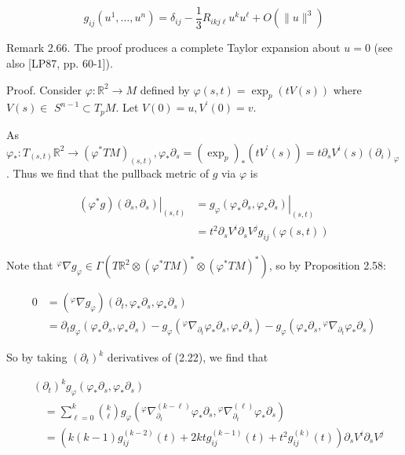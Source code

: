 \documentclass[10pt, letterpaper]{article}
\begin{document}
$$
g_{i j}\left(u^{1}, \ldots, u^{n}\right)=\delta_{i j}-\frac{1}{3} R_{i k j \ell} u^{k} u^{\ell}+O\left(\|u\|^{3}\right)
$$

Remark 2.66. The proof produces a complete Taylor expansion about $u=0$ (see also [LP87, pp. 60-1]).

Proof. Consider $\varphi: \mathbb{R}^{2} \rightarrow M$ defined by $\varphi(s, t)=\exp _{p}(t V(s))$ where $V(s) \in$ $S^{n-1} \subset T_{p} M$. Let $V(0)=u, V^{\prime}(0)=v$.

As $\varphi_{*}: T_{(s, t)} \mathbb{R}^{2} \rightarrow\left(\varphi^{*} T M\right)_{(s, t)}, \varphi_{*} \partial_{s}=\left(\exp _{p}\right)_{*}\left(t V^{\prime}(s)\right)=t \partial_{s} V^{i}(s)\left(\partial_{i}\right)_{\varphi}$. Thus we find that the pullback metric of $g$ via $\varphi$ is

$$
\begin{aligned}
\left.\left(\varphi^{*} g\right)\left(\partial_{s}, \partial_{s}\right)\right|_{(s, t)} & =\left.g_{\varphi}\left(\varphi_{*} \partial_{s}, \varphi_{*} \partial_{s}\right)\right|_{(s, t)} \\
& =t^{2} \partial_{s} V^{i} \partial_{s} V^{j} g_{i j}(\varphi(s, t))
\end{aligned}
$$

Note that ${ }^{\varphi} \nabla g_{\varphi} \in \Gamma\left(T \mathbb{R}^{2} \otimes\left(\varphi^{*} T M\right)^{*} \otimes\left(\varphi^{*} T M\right)^{*}\right)$, so by Proposition 2.58:

$$
\begin{aligned}
0 & =\left({ }^{\varphi} \nabla g_{\varphi}\right)\left(\partial_{t}, \varphi_{*} \partial_{s}, \varphi_{*} \partial_{s}\right) \\
& =\partial_{t} g_{\varphi}\left(\varphi_{*} \partial_{s}, \varphi_{*} \partial_{s}\right)-g_{\varphi}\left({ }^{\varphi} \nabla_{\partial_{t}} \varphi_{*} \partial_{s}, \varphi_{*} \partial_{s}\right)-g_{\varphi}\left(\varphi_{*} \partial_{s},{ }^{\varphi} \nabla_{\partial_{t}} \varphi_{*} \partial_{s}\right)
\end{aligned}
$$

So by taking $\left(\partial_{t}\right)^{k}$ derivatives of (2.22), we find that

$$
\begin{aligned}
& \left(\partial_{t}\right)^{k} g_{\varphi}\left(\varphi_{*} \partial_{s}, \varphi_{*} \partial_{s}\right) \\
& \quad=\sum_{\ell=0}^{k}\binom{k}{\ell} g_{\varphi}\left({ }^{\varphi} \nabla_{\partial_{t}}^{(k-\ell)} \varphi_{*} \partial_{s},{ }^{\varphi} \nabla_{\partial_{t}}^{(\ell)} \varphi_{*} \partial_{s}\right) \\
& \quad=\left(k(k-1) g_{i j}^{(k-2)}(t)+2 k t g_{i j}^{(k-1)}(t)+t^{2} g_{i j}^{(k)}(t)\right) \partial_{s} V^{i} \partial_{s} V^{j}
\end{aligned}
$$
\end{document}
